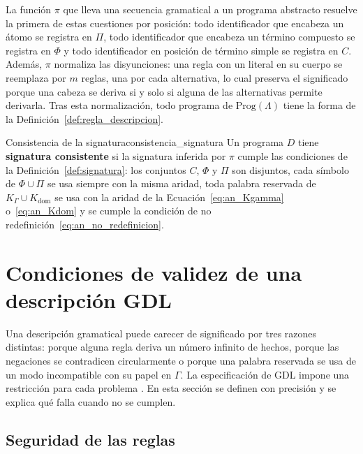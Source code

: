 La función $\pi$ que lleva una secuencia gramatical a un programa abstracto resuelve la primera de estas cuestiones por posición: todo identificador que encabeza un átomo se registra en $\Pi$, todo identificador que encabeza un término compuesto se registra en $\Phi$ y todo identificador en posición de término simple se registra en $C$. Además, $\pi$ normaliza las disyunciones: una regla con un literal  en su cuerpo se reemplaza por $m$ reglas, una por cada alternativa, lo cual preserva el significado porque una cabeza se deriva si y solo si alguna de las alternativas permite derivarla. Tras esta normalización, todo programa de $\mathrm{Prog}(\Lambda)$ tiene la forma de la Definición~\ref{def:regla_descripcion}.

\begin{definicion}{Consistencia de la signatura}{consistencia_signatura}
Un programa $D$ tiene \textbf{signatura consistente} si la signatura inferida por $\pi$ cumple las condiciones de la Definición~\ref{def:signatura}: los conjuntos $C$, $\Phi$ y $\Pi$ son disjuntos, cada símbolo de $\Phi \cup \Pi$ se usa siempre con la misma aridad, toda palabra reservada de $K_\Gamma \cup K_{\mathrm{dom}}$ se usa con la aridad de la Ecuación~\eqref{eq:an_Kgamma} o~\eqref{eq:an_Kdom} y se cumple la condición de no redefinición~\eqref{eq:an_no_redefinicion}.
\end{definicion}

\section{Condiciones de validez de una descripción GDL}
\label{sec:an_restricciones}

Una descripción gramatical puede carecer de significado por tres razones distintas: porque alguna regla deriva un número infinito de hechos, porque las negaciones se contradicen circularmente o porque una palabra reservada se usa de un modo incompatible con su papel en $\Gamma$. La especificación de GDL impone una restricción para cada problema \cite{Love2008GDL, GeneserethThielscher2014}. En esta sección se definen con precisión y se explica qué falla cuando no se cumplen.

\subsection{Seguridad de las reglas}

